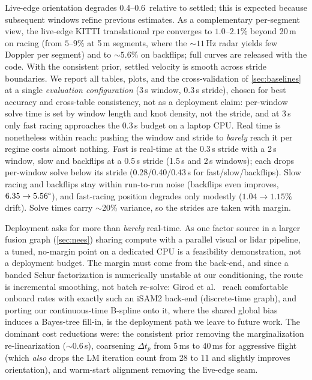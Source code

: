 Live-edge orientation degrades 0.4--0.6\degree\ relative to settled;
this is expected because subsequent windows refine previous estimates.
As a complementary per-segment view, the live-edge KITTI translational
\ac{rpe} converges to $1.0$--$2.1\%$ beyond 20\,m on racing (from
$5$--$9\%$ at 5\,m segments, where the ${\sim}11$\,Hz radar yields few
Doppler per segment) and to ${\sim}5.6\%$ on backflips; full curves are
released with the code.
With the consistent prior, settled velocity is smooth across stride
boundaries.
We report all tables, plots, and the cross-validation of
\autoref{sec:baselines} at a single \emph{evaluation configuration}
(3\,s window, 0.3\,s stride), chosen for best accuracy and cross-table
consistency, not as a deployment claim: per-window solve time is set
by window length and knot density, not the stride, and at 3\,s only fast
racing approaches the 0.3\,s budget on a laptop CPU.  Real time is
nonetheless within reach: pushing the window and stride to \emph{barely}
reach it per regime costs almost nothing.
Fast is real-time at the 0.3\,s stride with a 2\,s window, slow and
backflips at a 0.5\,s stride (1.5\,s and 2\,s windows);
each drops per-window solve below its stride
(0.28/0.40/0.43\,s for fast/slow/backflips).
Slow racing and
backflips stay within run-to-run noise (backflips even improves,
$6.35\to5.56\degree$), and fast-racing position degrades only modestly
($1.04\to1.15\%$ drift).  Solve times carry $\sim$20\% variance,
so the strides are taken with margin.

Deployment asks for more than \emph{barely} real-time.  As one factor source
in a larger fusion graph (\autoref{sec:nees}) sharing compute with a parallel
visual or lidar pipeline, a tuned, no-margin point on a dedicated CPU is a
feasibility demonstration, not a deployment budget.  The margin must come from
the back-end, and since a banded Schur factorization is numerically unstable
at our conditioning, the route is incremental smoothing, not batch re-solve:
Girod et al.~\cite{girod2024brio} reach comfortable onboard rates with exactly
such an iSAM2 back-end (discrete-time graph), and porting our continuous-time
B-spline onto it, where the shared global bias induces a Bayes-tree fill-in,
is the deployment path we leave to future work.
The dominant cost reductions were: the consistent prior removing
the marginalization re-linearization ($\sim$0.6\,s), coarsening
$\Delta t_p$ from 5\,ms to 40\,ms for aggressive flight (which
\emph{also} drops the LM iteration count from 28 to 11 and slightly
improves orientation), and warm-start alignment removing the
live-edge seam.

